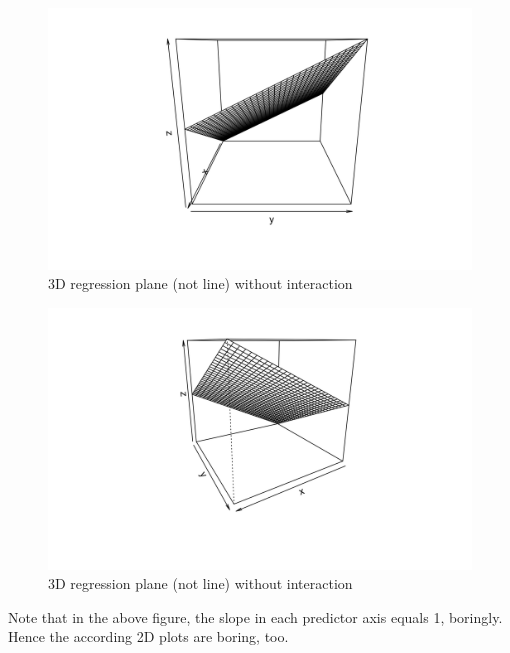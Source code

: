 \documentclass[
  letterpaper,
  DIV=11,
  numbers=noendperiod]{scrreprt}
\theoremstyle{definition}
\theoremstyle{definition}
\theoremstyle{remark}
\begin{document}
\begin{figure}

{\centering \includegraphics[width=5.83in,height=\textheight]{./img/3d2.png}

}

\caption{\label{fig-3dregr2-2}3D regression plane (not line) without
interaction}

\end{figure}

\begin{figure}

{\centering \includegraphics[width=5.83in,height=\textheight]{./img/3d3.png}

}

\caption{\label{fig-3dregr2-3}3D regression plane (not line) without
interaction}

\end{figure}

Note that in the above figure, the slope in each predictor axis equals
1, boringly. Hence the according 2D plots are boring, too.
\end{document}
